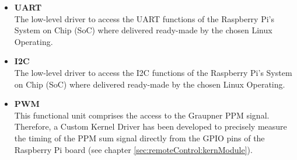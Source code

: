 \begin{itemize}
	\item \textbf{UART}\\
	The low-level driver to access the UART functions of the Raspberry Pi's System on Chip (SoC) where delivered ready-made by the chosen Linux Operating.
	
	\item \textbf{I2C}\\
	The low-level driver to access the I2C functions of the Raspberry Pi's System on Chip (SoC) where delivered ready-made by the chosen Linux Operating.
	
	\item \textbf{PWM}\\
	This functional unit comprises the access to the Graupner PPM signal. Therefore, a Custom Kernel Driver has been developed to precisely measure the timing of the PPM sum signal directly from the GPIO pins of the Raspberry Pi board (see chapter \ref{sec:remoteControl:kernModule}).
	
	
\end{itemize}

